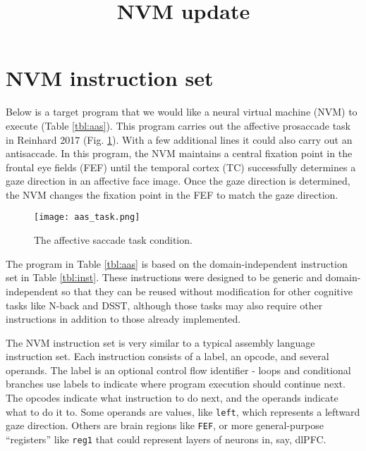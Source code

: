 \documentclass[pdftex,12pt,letterpaper]{article}
\begin{document}
\title{NVM update}
\date{}
\maketitle

\section{NVM instruction set}

Below is a target program that we would like a neural virtual machine (NVM) to execute (Table \ref{tbl:aas}).  This program carries out the affective prosaccade task in Reinhard 2017 (Fig. \ref{fig:aas_task}).  With a few additional lines it could also carry out an antisaccade.  In this program, the NVM maintains a central fixation point in the frontal eye fields (FEF) until the temporal cortex (TC) successfully determines a gaze direction in an affective face image.  Once the gaze direction is determined, the NVM changes the fixation point in the FEF to match the gaze direction.

\begin{figure}[H]
\centering
\texttt{[image: aas\_task.png]}
\caption{The affective saccade task condition.}
\label{fig:aas_task}
\end{figure}

The program in Table \ref{tbl:aas} is based on the domain-independent instruction set in Table \ref{tbl:inst}.  These instructions were designed to be generic and domain-independent so that they can be reused without modification for other cognitive tasks like N-back and DSST, although those tasks may also require other instructions in addition to those already implemented.

The NVM instruction set is very similar to a typical assembly language instruction set.  Each instruction consists of a label, an opcode, and several operands.  The label is an optional control flow identifier - loops and conditional branches use labels to indicate where program execution should continue next.  The opcodes indicate what instruction to do next, and the operands indicate what to do it to.  Some operands are values, like \texttt{left}, which represents a leftward gaze direction.  Others are brain regions like \texttt{FEF}, or more general-purpose ``registers'' like \texttt{reg1} that could represent layers of neurons in, say, dlPFC.
\end{document}
